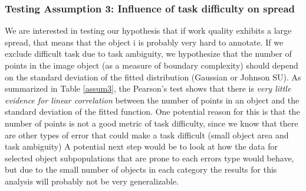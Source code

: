 \documentclass[12pt]{article}
\begin{document}
\subsubsection{Testing Assumption 3: Influence of task difficulty on spread}
We are interested in testing our hypothesis that if work quality exhibits a large spread, that means that the object i is probably very hard to annotate. If we exclude difficult task due to task ambiguity, we hypothesize that the number of points in the image object (as a measure of boundary complexity) should depend on the standard deviation of the fitted distribution (Gaussian or Johnson SU). As summarized in Table \ref{assum3}, the Pearson's test shows that there is \textit{very little evidence for linear correlation} between the number of points in an object and the standard deviation of the fitted function. One potential reason for this is that the number of points is not a good metric of task difficulty, since we know that there are other types of error that could make a task difficult (small object area and task ambiguity) A potential next step would be to look at how the data for selected object subpopulations that are prone to each errors type would behave, but due to the small number of objects in each category the results for this analysis will probably not be very generalizable. 


\end{document}

